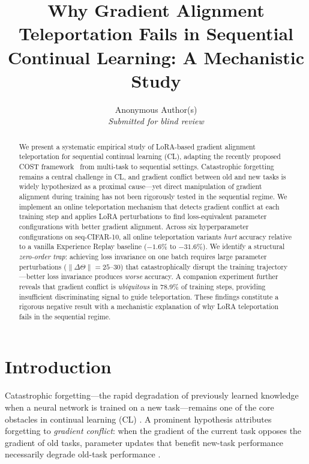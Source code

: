 \documentclass{article}
\title{Why Gradient Alignment Teleportation Fails in Sequential Continual Learning:
       A Mechanistic Study}
\author{
  Anonymous Author(s)\\
  \textit{Submitted for blind review}
}
\begin{document}
\maketitle

\begin{abstract}
We present a systematic empirical study of LoRA-based gradient alignment teleportation
for sequential continual learning (CL), adapting the recently proposed COST framework~\citep{zhou2025cost}
from multi-task to sequential settings.
Catastrophic forgetting remains a central challenge in CL, and gradient conflict between
old and new tasks is widely hypothesized as a proximal cause---yet direct manipulation
of gradient alignment during training has not been rigorously tested in the sequential regime.
We implement an online teleportation mechanism that detects gradient conflict at each
training step and applies LoRA perturbations to find loss-equivalent parameter configurations
with better gradient alignment.
Across six hyperparameter configurations on seq-CIFAR-10, all online teleportation variants
\emph{hurt} accuracy relative to a vanilla Experience Replay baseline ($-1.6\%$ to $-31.6\%$).
We identify a structural \emph{zero-order trap}: achieving loss invariance on one batch
requires large parameter perturbations ($\|\Delta\Theta\| = 25$--$30$) that catastrophically
disrupt the training trajectory---better loss invariance produces \emph{worse} accuracy.
A companion experiment further reveals that gradient conflict is \emph{ubiquitous} in 78.9\%
of training steps, providing insufficient discriminating signal to guide teleportation.
These findings constitute a rigorous negative result with a mechanistic explanation
of why LoRA teleportation fails in the sequential regime.
\end{abstract}

\section{Introduction}
\label{sec:intro}

Catastrophic forgetting---the rapid degradation of previously learned knowledge when a
neural network is trained on a new task---remains one of the core obstacles in continual
learning (CL) \citep{kirkpatrick2017ewc, vandeven2022survey}.
A prominent hypothesis attributes forgetting to \emph{gradient conflict}: when the gradient
of the current task opposes the gradient of old tasks, parameter updates that benefit new-task
performance necessarily degrade old-task performance \citep{lopezpaz2017gem, yu2020pcgrad}.
\end{document}
